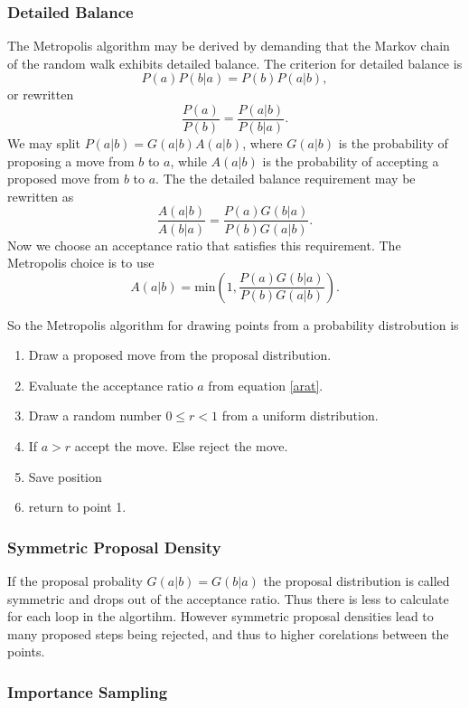 \documentclass[a4paper,English,10pt]{article}
\newcommand{\be}{\begin{equation}}
\newcommand{\ee}{\end{equation}}
\newcommand{\f}{\frac}
\begin{document}
\subsubsection{Detailed Balance}
The Metropolis algorithm may be derived by demanding that the Markov chain of the random walk exhibits detailed balance.
The criterion for detailed balance is
\be
P(a)P(b|a) = P(b)P(a|b),
\ee
or rewritten
\be
\f{P(a)}{P(b)} = \f{P(a|b)}{P(b|a)}.
\ee
We may split \(P(a|b) = G(a|b)A(a|b)\), where \(G(a|b)\) is the probability of proposing a move from $b$ to $a$, while
$A(a|b)$ is the probability of accepting a proposed move from $b$ to $a$. The the detailed balance requirement may be rewritten as
\be
\f{A(a|b)}{A(b|a)} = \f{P(a)G(b|a)}{P(b)G(a|b)}.
\ee
Now we choose an acceptance ratio that satisfies this requirement. The Metropolis choice is to use
\be
A(a|b) = \mathrm{min}\left(1,\f{P(a)G(b|a)}{P(b)G(a|b)}\right).\label{arat}
\ee

So the Metropolis algorithm for drawing points from a probability distrobution is
\begin{enumerate}
\item
  Draw a proposed move from the proposal distribution.
\item
  Evaluate the acceptance ratio $a$ from equation \ref{arat}.
\item
  Draw a random number $0 \leq r < 1$ from a uniform distribution.
\item
  If $a>r$ accept the move. Else reject the move.
\item
  Save position
\item
  return to point 1.
\end{enumerate}
  
  

\subsubsection{Symmetric Proposal Density}

If the proposal probality $G(a|b) = G(b|a)$ the proposal distribution is called symmetric and drops out of the acceptance ratio.
Thus there is less to calculate for each loop in the algortihm. However symmetric proposal densities lead to many proposed steps being rejected,
and thus to higher corelations between the points.


\subsubsection{Importance Sampling}
\end{document}
